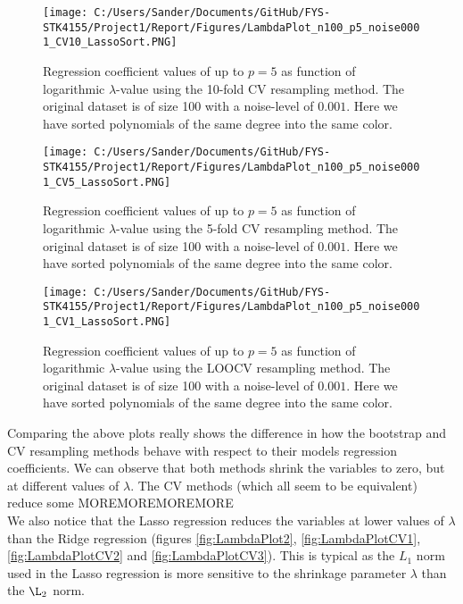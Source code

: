 \documentclass[12pt,a4paper]{article}
\begin{document}
\begin{figure}[H]
\centering
\texttt{[image: C:/Users/Sander/Documents/GitHub/FYS-STK4155/Project1/Report/Figures/LambdaPlot\_n100\_p5\_noise0001\_CV10\_LassoSort.PNG]}
\caption{\label{fig:LambdaLasso2} Regression coefficient values of up to $p = 5$ as function of logarithmic $\lambda$-value using the 10-fold CV resampling method. The original dataset is of size 100 with a noise-level of $0.001$. Here we have sorted polynomials of the same degree into the same color.}
\end{figure}

\begin{figure}[H]
\centering
\texttt{[image: C:/Users/Sander/Documents/GitHub/FYS-STK4155/Project1/Report/Figures/LambdaPlot\_n100\_p5\_noise0001\_CV5\_LassoSort.PNG]}
\caption{\label{fig:LambdaLasso3} Regression coefficient values of up to $p = 5$ as function of logarithmic $\lambda$-value using the 5-fold CV resampling method. The original dataset is of size 100 with a noise-level of $0.001$. Here we have sorted polynomials of the same degree into the same color.}
\end{figure}

\begin{figure}[H]
\centering
\texttt{[image: C:/Users/Sander/Documents/GitHub/FYS-STK4155/Project1/Report/Figures/LambdaPlot\_n100\_p5\_noise0001\_CV1\_LassoSort.PNG]}
\caption{\label{fig:LambdaLasso4} Regression coefficient values of up to $p = 5$ as function of logarithmic $\lambda$-value using the LOOCV resampling method. The original dataset is of size 100 with a noise-level of $0.001$. Here we have sorted polynomials of the same degree into the same color.}
\end{figure}

\noindent Comparing the above plots really shows the difference in how the bootstrap and CV resampling methods behave with respect to their models regression coefficients. We can observe that both methods shrink the variables to zero, but at different values of $\lambda$. The CV methods (which all seem to be equivalent) reduce some MOREMOREMOREMORE
\\
We also notice that the Lasso regression reduces the variables at lower values of $\lambda$ than the Ridge regression (figures \ref{fig:LambdaPlot2}, \ref{fig:LambdaPlotCV1}, \ref{fig:LambdaPlotCV2} and \ref{fig:LambdaPlotCV3}). This is typical as the $L_1$ norm used in the Lasso regression is more sensitive to the shrinkage parameter $\lambda$ than the $\L_2$ norm. 
\end{document}
